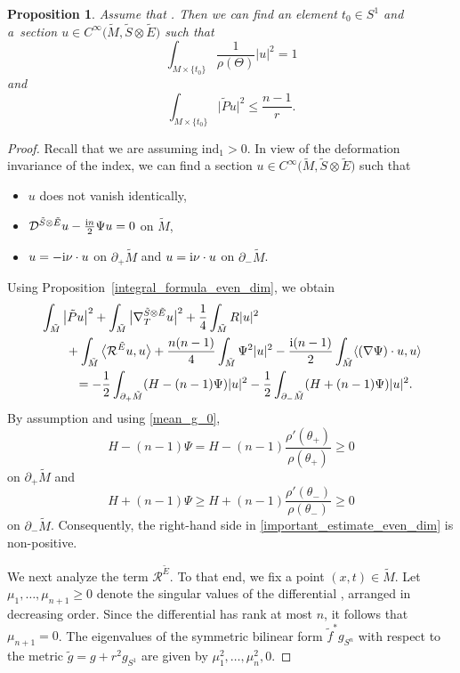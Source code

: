 \documentclass[pdftex]{sigma}
\numberwithin{equation}{section}
\newtheorem{Proposition}[Theorem]{Proposition}
 { \theoremstyle{definition}
\newtheorem{Definition}[Theorem]{Definition}
\newtheorem{Note}[Theorem]{Note}
\newtheorem{Example}[Theorem]{Example}
\newtheorem{Remark}[Theorem]{Remark} }
\begin{document}
\begin{Proposition}
\label{existence_of_spinor_even_dim}
Assume that . Then we can find an element $t_0 \in S^1$ and a~section $u \in C^\infty\big(\tilde{M},\tilde{S} \otimes \tilde{E}\big)$ such that
\[\int_{M \times \{t_0\}} \frac{1}{\rho(\Theta)} |u|^2 = 1\]
and
\[\int_{M \times \{t_0\}} \big|\tilde{P} u\big|^2 \leq \frac{n-1}{r}.\]
\end{Proposition}

\begin{proof}
Recall that we are assuming $\mathrm{ind}_1 > 0$. In view of the deformation invariance of the index, we can find a section $u \in C^\infty\big(\tilde{M},\tilde{S} \otimes \tilde{E}\big)$ such that
\begin{itemize}\itemsep=0pt
 \item $u$ does not vanish identically,
 \item $\mathcal{D}^{\tilde{S} \otimes \tilde{E}} u - \frac{{\rm i}n}{2} \Psi u = 0$ on $\tilde{M}$,
 \item $u = -{\rm i} \nu \cdot u$ on $\partial_+ \tilde{M}$ and $u = {\rm i} \nu \cdot u$ on $\partial_- \tilde{M}$.
\end{itemize}
Using Proposition~\ref{integral_formula_even_dim}, we obtain
\begin{align}
&\int_{\tilde{M}} \big|\tilde{P} u\big|^2 + \int_{\tilde{M}} \big|\nabla_T^{\tilde{S} \otimes \tilde{E}} u\big|^2 + \frac{1}{4} \int_{\tilde{M}} R |u|^2\nonumber \\
&\qquad{}+ \int_{\tilde{M}} \big\langle \mathcal{R}^{\tilde{E}} u,u \big\rangle + \frac{n(n-1)}{4} \int_{\tilde{M}} \Psi^2 |u|^2 - \frac{{\rm i}(n-1)}{2} \int_{\tilde{M}} \langle (\nabla \Psi) \cdot u,u \rangle \nonumber\\
&\phantom{\qquad+}{}= -\frac{1}{2} \int_{\partial_+ \tilde{M}} (H-(n-1)\Psi) |u|^2 - \frac{1}{2} \int_{\partial_- \tilde{M}} (H+(n-1)\Psi) |u|^2.\label{important_estimate_even_dim}
\end{align}
By assumption and using \eqref{mean_g_0}, \[H-(n-1)\Psi = H-(n-1) \frac{\rho'(\theta_+)}{\rho(\theta_+)} \geq 0\] on $\partial_+ \tilde{M}$ and \[H +(n-1)\Psi \geq H+(n-1) \frac{\rho'(\theta_-)}{\rho(\theta_-)} \geq 0\] on $\partial_- \tilde{M}$. Consequently, the right-hand side in \eqref{important_estimate_even_dim} is non-positive.

We next analyze the term $\mathcal{R}^{\tilde{E}}$. To that end, we fix a point $(x,t) \in \tilde{M}$. Let $ \mu_1,\hdots,\mu_{n+1} \geq 0$ denote the singular values of the differential , arranged in decreasing order. Since the differential  has rank at most $n$, it follows that $\mu_{n+1} = 0$.
The eigenvalues of the symmetric bilinear form $\tilde{f}^* g_{S^n}$ with respect to the metric $\tilde{g} = g + r^2 g_{S^1}$ are given by $\mu_1^2,\hdots,\mu_n^2,0$.


\end{proof}
\end{document}

